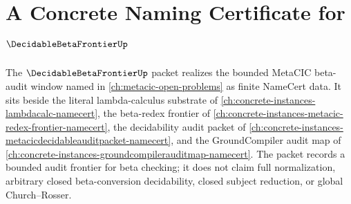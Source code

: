 \chapter{A Concrete Naming Certificate for $\DecidableBetaFrontierUp$}
\label{ch:concrete-instances-decidable-beta-frontier-namecert}

The $\DecidableBetaFrontierUp$ packet realizes the bounded MetaCIC beta-audit window named in \autoref{ch:metacic-open-problems} as finite NameCert data. It sits beside the literal lambda-calculus substrate of \autoref{ch:concrete-instances-lambdacalc-namecert}, the beta-redex frontier of \autoref{ch:concrete-instances-metacic-redex-frontier-namecert}, the decidability audit packet of \autoref{ch:concrete-instances-metacicdecidableauditpacket-namecert}, and the GroundCompiler audit map of \autoref{ch:concrete-instances-groundcompilerauditmap-namecert}. The packet records a bounded audit frontier for beta checking; it does not claim full normalization, arbitrary closed beta-conversion decidability, closed subject reduction, or global Church--Rosser.

